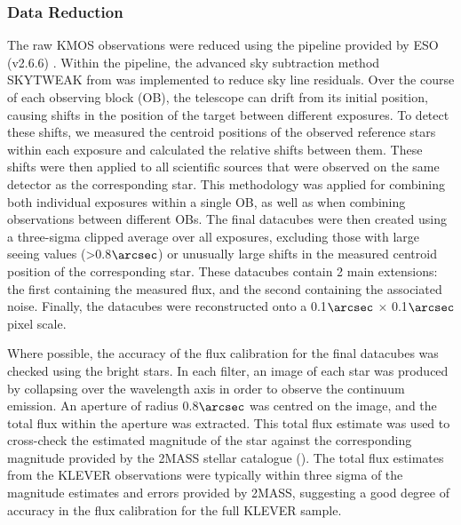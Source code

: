 \documentclass[usenatbib]{mnras} %
\begin{document}
\subsubsection{Data Reduction} \label{DataReduc}

The raw KMOS observations were reduced using the pipeline provided by ESO (v2.6.6) . Within the pipeline, the advanced sky subtraction method SKYTWEAK from \cite{Davies_2007} was implemented to reduce sky line residuals. Over the course of each observing block (OB), the telescope can drift from its initial position, causing shifts in the position of the target between different exposures. To detect these shifts, we measured the centroid positions of the observed reference stars within each exposure and calculated the relative shifts between them. These shifts were then applied to all scientific sources that were observed on the same detector as the corresponding star. This methodology was applied for combining both individual exposures within a single OB, as well as when combining observations between different OBs. The final datacubes were then created using a three-sigma clipped average over all exposures, excluding those with large seeing values (>0.8$\arcsec$) or unusually large shifts in the measured centroid position of the corresponding star. These datacubes contain 2 main extensions: the first containing the measured flux, and the second containing the associated noise. Finally, the datacubes were reconstructed onto a 0.1$\arcsec$ $\times$ 0.1$\arcsec$ pixel scale.

Where possible, the accuracy of the flux calibration for the final datacubes was checked using the bright stars. In each filter, an image of each star was produced by collapsing over the wavelength axis in order to observe the continuum emission. An aperture of radius 0.8$\arcsec$ was centred on the image, and the total flux within the aperture was extracted. This total flux estimate was used to cross-check the estimated magnitude of the star against the corresponding magnitude provided by the 2MASS stellar catalogue (\citealt{Skrutskie_2006}). The total flux estimates from the KLEVER observations were typically within three sigma of the magnitude estimates and errors provided by 2MASS, suggesting a good degree of accuracy in the flux calibration for the full KLEVER sample.

\end{document}
